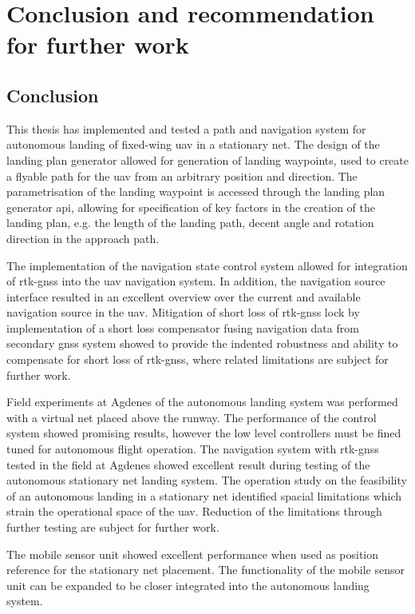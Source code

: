 \chapter{Conclusion and recommendation for further work}
\section{Conclusion}
This thesis has implemented and tested a path and navigation system for autonomous landing of fixed-wing \gls{uav} in a stationary net. The design of the landing plan generator allowed for generation of landing waypoints, used to create a flyable path for the \gls{uav} from an arbitrary position and direction. The parametrisation of the landing waypoint is accessed through the landing plan generator \gls{api}, allowing for specification of key factors in the creation of the landing plan, e.g. the length of the landing path, decent angle and rotation direction in the approach path.

The implementation of the navigation state control system allowed for integration of \gls{rtk-gnss} into the \gls{uav} navigation system. In addition, the navigation source interface resulted in an excellent overview over the current and available navigation source in the \gls{uav}. Mitigation of short loss of \gls{rtk-gnss} lock by implementation of a short loss compensator fusing navigation data from secondary \gls{gnss} system showed to provide the indented robustness and ability to compensate for short loss of \gls{rtk-gnss}, where related limitations are subject for further work.

Field experiments at Agdenes of the autonomous landing system was performed with a virtual net placed above the runway. The performance of the control system showed promising results, however the low level controllers must be fined tuned for autonomous flight operation. The navigation system with \gls{rtk-gnss} tested in the field at Agdenes showed excellent result during testing of the autonomous stationary net landing system. The operation study on the feasibility of an autonomous landing in a stationary net identified spacial limitations which strain the operational space of the \gls{uav}. Reduction of the limitations through further testing are subject for further work.  

The mobile sensor unit showed excellent performance when used as position reference for the stationary net placement. The functionality of the mobile sensor unit can be expanded to be closer integrated into the autonomous landing system.

